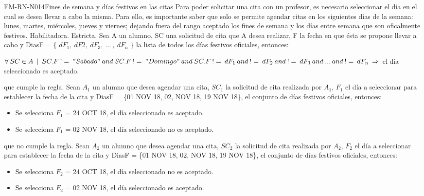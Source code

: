 \begin{BussinesRule}{EM-RN-N014}{Fines de semana y días festivos en las citas}
	\BRitem[Descripción:] Para poder solicitar una cita con un profesor, es necesario seleccionar el día en el cual se desea llevar a cabo la misma. Para ello, es importante saber que solo se permite agendar citas en los siguientes días de la semana: lunes, martes, miércoles, jueves y viernes; dejando fuera del rango aceptado los fines de semana y los días entre semana que son oficalmente festivos. 
	\BRitem[Tipo: ] Habilitadora.
	\BRitem[Nivel: ] Estricta.
	\BRitem[Sentenia: ] Sea A un alumno, SC una solicitud de cita que A desea realizar, F la fecha en que ésta se propone llevar a cabo y DiasF = \{ $dF_{1}, \: dF{2}, \: dF_{3}, \: ... \: , \: dF_{n}$ \} la lista de todos los días festivos oficiales, entonces:
	\begin{center}
		$\forall \: SC \in A \: \mid \: SC.F \: != \: "Sabado" \: and \: SC.F \: != \: "Domingo" \: and \: SC.F \: != \: dF_{1} \: and \: != \: dF_{2} \: and \: != \: dF_{3} \: and \: ... \: and \: != \: dF_{n} \: \Rightarrow$ el día seleccionado es aceptado.
	\end{center}
	 que cumple la regla.
		Sean $A_{1}$ un alumno que desea agendar una cita, $SC_{1}$ la solicitud de cita realizada por $A_{1}$, $F_{1}$ el día a seleccionar para establecer la fecha de la cita y DiasF = \{01 NOV 18, 02, NOV 18, 19 NOV 18\}, el conjunto de días festivos oficiales, entonces:
		\begin{itemize}
			\item Se selecciona $F_{1}$ = 24 OCT 18, el día seleccionado es aceptado.
			\item Se selecciona $F_{1}$ = 02 NOV 18, el día seleccionado no es aceptado.
		\end{itemize}
	 que no cumple la regla.
		Sean $A_{2}$ un alumno que desea agendar una cita, $SC_{2}$ la solicitud de cita realizada por $A_{2}$, $F_{2}$ el día a seleccionar para establecer la fecha de la cita y DiasF = \{01 NOV 18, 02, NOV 18, 19 NOV 18\}, el conjunto de días festivos oficiales, entonces:
		\begin{itemize}
			\item Se selecciona $F_{2}$ = 24 OCT 18, el día seleccionado no es aceptado.
			\item Se selecciona $F_{2}$ = 02 NOV 18, el día seleccionado es aceptado.
		\end{itemize}

\end{BussinesRule}


